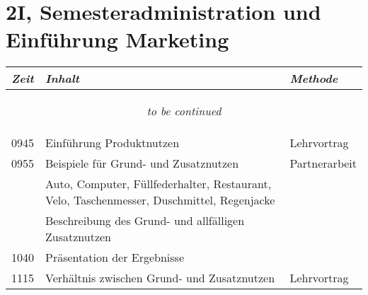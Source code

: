 \documentclass[a4paper]{scrreprt}
\begin{document}
\section*{2I, Semesteradministration und Einführung Marketing}
\begin{longtable}{p{1.5cm}>{\RaggedRight}p{7.5cm}p{2.5cm}}
    \toprule
    \emph{Zeit}&\emph{Inhalt}&\emph{Methode}\\
    \midrule
    \endhead

    \midrule
    \multicolumn{3}{c}{\begin{tiny}\textit{to be continued}\end{tiny}}\\
    \midrule
    \endfoot

    \bottomrule
    \endlastfoot

    0945&Einführung Produktnutzen&Lehrvortrag\\ [5pt]

    0955&Beispiele für Grund- und Zusatznutzen&Partnerarbeit\\
        &Auto, Computer, Füllfederhalter, Restaurant, Velo,
        Taschenmesser, Duschmittel, Regenjacke&\\
        &Beschreibung des Grund- und allfälligen Zusatznutzen&\\ [5pt]

    1040&Präsentation der Ergebnisse&\\ [5pt]

    1115&Verhältnis zwischen Grund- und Zusatznutzen&Lehrvortrag\\ [5pt]

\end{longtable}
\end{document}
